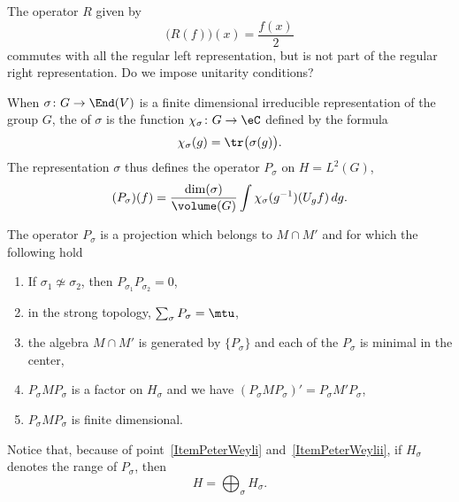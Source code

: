 \begin{probleme}
	The operator $R$ given by
	\begin{equation}
		\big(R(f)\big)(x)=\frac{ f(x) }{ 2 }
	\end{equation}
	commutes with all the regular left representation, but is not part of the regular right representation. Do we impose unitarity conditions?
\end{probleme}

When $\sigma\colon G\to \End(V)$ is a finite dimensional irreducible representation of the group $G$, the  of $\sigma$ is the function $\chi_{\sigma}\colon G\to \eC$ defined by the formula
\begin{equation}
	\chi_{\sigma}(g)=\tr\big( \sigma(g) \big).
\end{equation}
The representation $\sigma$ thus defines the operator $P_{\sigma}$ on $H=L^2(G)$,
\begin{equation}
	(P_{\sigma})(f)=\frac{ \dim(\sigma) }{ \volume(G) }\int \chi_{\sigma}(g^{-1})(U_gf)\,dg.
\end{equation}

\begin{theorem}			\label{ThoPeterWeyl}
	The operator $P_{\sigma}$ is a projection which belongs to $M\cap M'$ and for which the following hold
	\begin{enumerate}
		\item\label{ItemPeterWeyli} If $\sigma_1\nsimeq \sigma_2$, then $P_{\sigma_1}P_{\sigma_2}=0$,
		\item \label{ItemPeterWeylii} in the strong topology, $\sum_{\sigma}P_{\sigma}=\mtu$,
		\item the algebra $M\cap M'$ is generated by $\{ P_{\sigma} \}$ and each of the $P_{\sigma}$ is minimal in the center,
		\item $P_{\sigma}MP_{\sigma}$ is a factor on $H_{\sigma}$ and we have $(P_{\sigma}MP_{\sigma})'=P_{\sigma}M'P_{\sigma}$,
		\item $P_{\sigma}MP_{\sigma}$ is finite dimensional.
	\end{enumerate}
\end{theorem}

Notice that, because of point~\ref{ItemPeterWeyli} and~\ref{ItemPeterWeylii}, if $H_{\sigma}$ denotes the range of $P_{\sigma}$, then
\begin{equation}
	H=\bigoplus_{\sigma}H_{\sigma}.
\end{equation}

